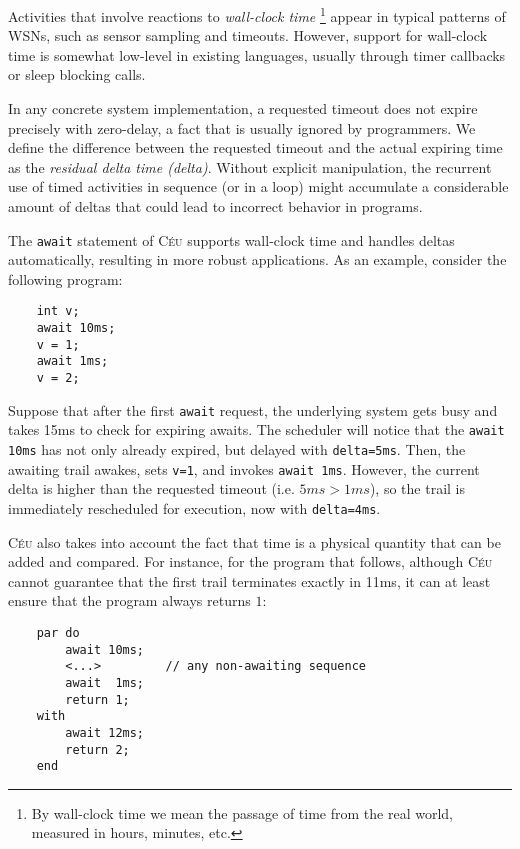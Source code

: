 \documentclass[10pt]{sensys-proc}
\newcommand{\CEU}{\textsc{C\'{e}u}\xspace}
\newcommand{\code}[1] {{\small{\texttt{#1}}}}
\begin{document}
Activities that involve reactions to \emph{wall-clock time}%
\footnote{
By wall-clock time we mean the passage of time from the real world, measured in 
hours, minutes, etc.
}
appear in typical patterns of WSNs, such as sensor sampling and timeouts.
However, support for wall-clock time is somewhat low-level in existing 
languages, usually through timer callbacks or sleep blocking calls.

In any concrete system implementation, a requested timeout does not expire 
precisely with zero-delay, a fact that is usually ignored by programmers.
We define the difference between the requested timeout and the actual expiring 
time as the \emph{residual delta time (delta)}.
Without explicit manipulation, the recurrent use of timed activities in 
sequence (or in a loop) might accumulate a considerable amount of deltas that 
could lead to incorrect behavior in programs.

The \code{await} statement of \CEU supports wall-clock time and handles deltas 
automatically, resulting in more robust applications.
As an example, consider the following program:

{\small
\begin{verbatim}
    int v;
    await 10ms;
    v = 1;
    await 1ms;
    v = 2;
\end{verbatim}
}

Suppose that after the first \code{await} request, the underlying system gets 
busy and takes 15ms to check for expiring awaits.
The scheduler will notice that the \code{await 10ms} has not only already 
expired, but delayed with \code{delta=5ms}.
Then, the awaiting trail awakes, sets \code{v=1}, and invokes \code{await 1ms}.
However, the current delta is higher than the requested timeout (i.e. $5ms > 
1ms$), so the trail is immediately rescheduled for execution, now with 
\code{delta=4ms}.

\CEU also takes into account the fact that time is a physical quantity that can 
be added and compared.
For instance, for the program that follows, although \CEU cannot guarantee that 
the first trail terminates exactly in 11ms, it can at least ensure that the 
program always returns $1$:

{\small
\begin{verbatim}
    par do
        await 10ms;
        <...>         // any non-awaiting sequence
        await  1ms;
        return 1;
    with
        await 12ms;
        return 2;
    end
\end{verbatim}
}
\end{document}
